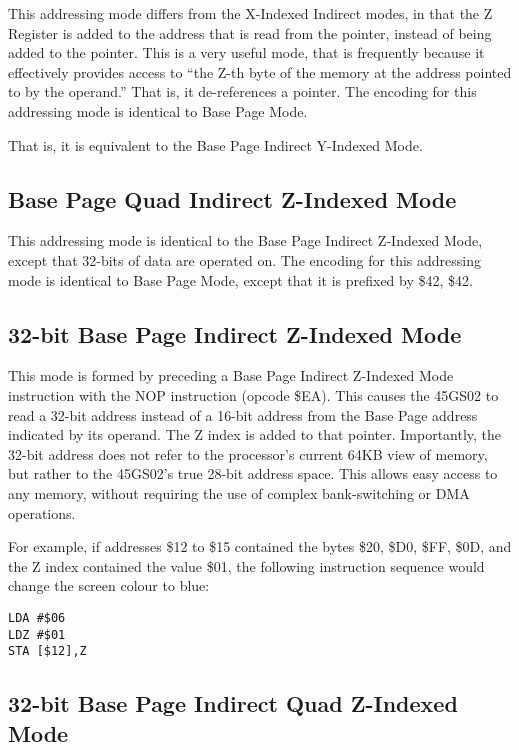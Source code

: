 This addressing mode differs from the X-Indexed Indirect modes, in that the Z Register is
added to the address that is read from the pointer, instead of being added to the pointer.
This is a very useful mode, that is frequently because it effectively provides access to
``the Z-th byte of the memory at the address pointed to by the operand.'' That is, it de-references
a pointer.
The encoding for this addressing mode is identical to Base Page Mode.

That is, it is equivalent to the Base Page Indirect Y-Indexed Mode.

\subsection{Base Page Quad Indirect Z-Indexed Mode}

This addressing mode is identical to the Base Page Indirect Z-Indexed Mode, except that
32-bits of data are operated on. The encoding for this addressing mode is identical to
Base Page Mode, except that it is prefixed by \$42, \$42.

\subsection{32-bit Base Page Indirect Z-Indexed Mode}

This mode is formed by preceding a Base Page Indirect Z-Indexed Mode instruction with
the {NOP} instruction (opcode \$EA).  This causes the 45GS02 to read a 32-bit address instead
of a 16-bit address from the Base Page address indicated by its operand.  The Z index is added
to that pointer.  Importantly, the 32-bit address does not refer to the processor's current 64KB
view of memory, but rather to the 45GS02's true 28-bit address space. This allows easy access
to any memory, without requiring the use of complex bank-switching or DMA operations.

For example, if addresses \$12 to \$15 contained the bytes \$20, \$D0, \$FF, \$0D, and the
Z index contained the value \$01, the following instruction sequence would change the screen
colour to blue:

\begin{tcolorbox}[colback=black,coltext=white]
\verbatimfont{\codefont}
\begin{verbatim}
LDA #$06
LDZ #$01
STA [$12],Z
\end{verbatim}
\end{tcolorbox}

\subsection{32-bit Base Page Indirect Quad Z-Indexed Mode}

